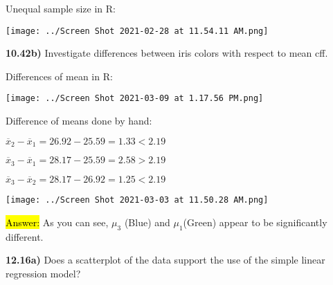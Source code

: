 \documentclass{article}
\begin{document}
\vspace{2mm}

Unequal sample size in R:

\vspace{2mm}

\texttt{[image: ../Screen Shot 2021-02-28 at 11.54.11 AM.png]}

\vspace{5mm}

\textbf{10.42b)} Investigate differences between iris colors with respect to mean cff.

\vspace{2mm}

Differences of mean in R:

\vspace{2mm}


\texttt{[image: ../Screen Shot 2021-03-09 at 1.17.56 PM.png]}

Difference of means done by hand:

\vspace{2mm}

$\overline{x}_{2}-\overline{x}_{1}=26.92-25.59=1.33<2.19$

\vspace{2mm}

$\overline{x}_{3}-\overline{x}_{1}=28.17-25.59=2.58>2.19$

\vspace{2mm}

$\overline{x}_{3}-\overline{x}_{2}=28.17-26.92=1.25<2.19$

\vspace{2mm}



\texttt{[image: ../Screen Shot 2021-03-03 at 11.50.28 AM.png]}

\vspace{2mm}

\hl{Answer:} As you can see, $\mu_{3}$ (Blue) and $\mu_{1}$(Green) appear to be significantly different.
















\newpage
\textbf{12.16a)}  Does a scatterplot of the data support the use of the simple linear regression model?
\end{document}
